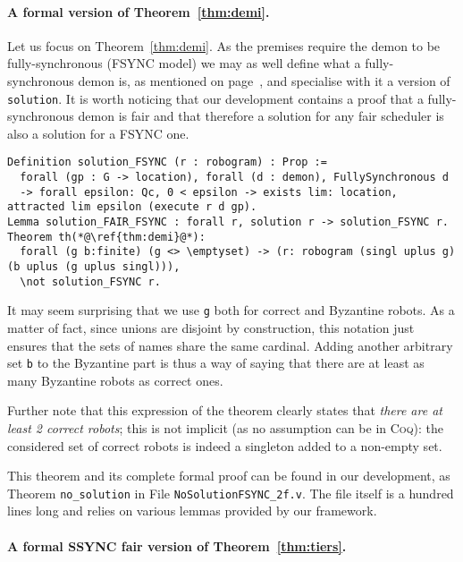 \documentclass[11pt,a4]{llncs}
\newcommand{\x}{\xspace}
\newcommand{\coq}{\textsc{Coq}\x}
\begin{document}
\paragraph{A formal version of Theorem~\ref{thm:demi}.}\label{sec:formal_demi}
Let us focus on Theorem~\ref{thm:demi}. As the premises require the
demon to be fully-synchronous (FSYNC model) we may as well define what
a fully-synchronous demon is, as mentioned on page~\pageref{page:formal_fsync}, and specialise with it a version of
\lstinline!solution!. It is worth noticing that our development contains a proof that a
fully-synchronous demon is fair and that therefore a solution for any
fair scheduler is also a solution for a FSYNC one.

\begin{lstlisting}
Definition solution_FSYNC (r : robogram) : Prop := 
  forall (gp : G -> location), forall (d : demon), FullySynchronous d 
  -> forall epsilon: Qc, 0 < epsilon -> exists lim: location, attracted lim epsilon (execute r d gp).
Lemma solution_FAIR_FSYNC : forall r, solution r -> solution_FSYNC r.
Theorem th(*@\ref{thm:demi}@*):
  forall (g b:finite) (g <> \emptyset) -> (r: robogram (singl uplus g) (b uplus (g uplus singl))), 
  \not solution_FSYNC r.
\end{lstlisting}
It may seem surprising that we use \texttt{g} both for correct and
Byzantine robots. As a matter of fact, since unions are disjoint by
construction, this notation just ensures that the sets of names share
the same cardinal. Adding another arbitrary set \texttt{b} to the
Byzantine part is thus a way of saying that there are at least as many
Byzantine robots as correct ones.

Further note that this expression of the theorem clearly
states that \emph{there are at least 2 correct robots}; this is not
implicit (as no assumption can be in \coq): the considered set of
correct robots is indeed a singleton added to a
non-empty set.

This theorem and its complete formal proof can be found in our
development, as Theorem \lstinline!no_solution! in File
\lstinline!NoSolutionFSYNC_2f.v!. The file itself is a hundred lines long
and relies on various lemmas provided by our
framework.


\paragraph{A formal SSYNC fair version of Theorem~\ref{thm:tiers}.}\label{sec:formal_tiers}
\end{document}
